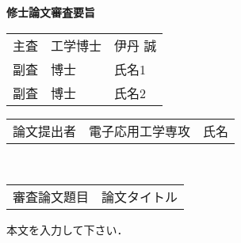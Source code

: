 \documentclass[12pt]{jarticle}
\begin{document}
\begin{center}
{\baselineskip=15mm
\Large \bf 修士論文審査要旨}
\end{center}

{\large
\begin{flushright}
\begin{tabular}{lll}
\large{主査}&\large{工学博士}& \large{伊丹 誠}\\
\large{副査}&\large{博士}& \large{氏名1}\\
\large{副査} & \large{博士}& \large{氏名2}\\
\end{tabular}
\end{flushright}
}

\noindent
\begin{tabular}{lll}
\large{論文提出者}&\large{\hspace{1zw}電子応用工学専攻}&\hspace{1zw}
\large{氏名}
\end{tabular}
\\
\begin{tabular}{ll}
\large{審査論文題目}&\parbox[t]{30zw}{
\large{論文タイトル}
}
\end{tabular}
\baselineskip=7mm
\normalsize
\vspace{0.5cm}

本文を入力して下さい．
\end{document}
